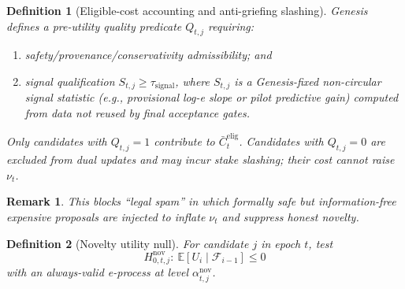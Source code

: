 \documentclass[11pt,a4paper]{article}
\newtheorem{definition}{Definition}[section]
\newtheorem{remark}{Remark}[section]
\begin{document}
\begin{definition}[Eligible-cost accounting and anti-griefing slashing]
Genesis defines a pre-utility quality predicate $Q_{t,j}$ requiring:
\begin{enumerate}[leftmargin=*]
\item safety/provenance/conservativity admissibility; and
\item signal qualification $S_{t,j}\ge \tau_{\mathrm{signal}}$, where $S_{t,j}$ is a Genesis-fixed non-circular signal statistic (e.g., provisional log-e slope or pilot predictive gain) computed from data not reused by final acceptance gates.
\end{enumerate}
Only candidates with $Q_{t,j}=1$ contribute to $\bar C_t^{\mathrm{elig}}$.
Candidates with $Q_{t,j}=0$ are excluded from dual updates and may incur stake slashing; their cost cannot raise $\nu_t$.
\end{definition}

\begin{remark}
This blocks ``legal spam'' in which formally safe but information-free expensive proposals are injected to inflate $\nu_t$ and suppress honest novelty.
\end{remark}

\begin{definition}[Novelty utility null]
For candidate $j$ in epoch $t$, test
\[
H^{\mathrm{nov}}_{0,t,j}:\ \mathbb{E}[U_i\mid\mathcal{F}_{i-1}]\le0
\]
with an always-valid e-process at level $\alpha^{\mathrm{nov}}_{t,j}$.
\end{definition}
\end{document}
